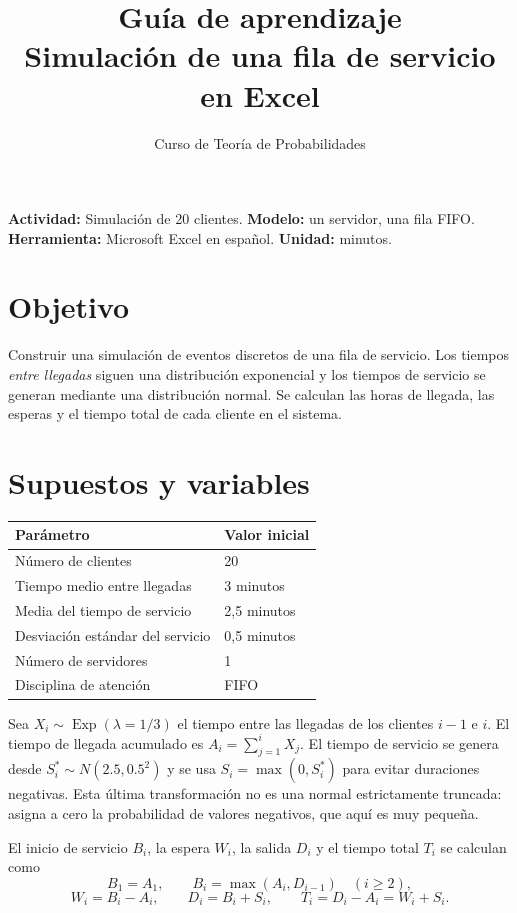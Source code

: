 \documentclass[11pt,a4paper]{article}
\title{\textcolor{azul}{Guía de aprendizaje}\\Simulación de una fila de servicio en Excel}
\author{Curso de Teoría de Probabilidades}
\date{}
\begin{document}
\maketitle
\noindent\textbf{Actividad:} Simulación de 20 clientes. \quad \textbf{Modelo:} un servidor, una fila FIFO.\\
\textbf{Herramienta:} Microsoft Excel en español. \quad \textbf{Unidad:} minutos.
\section{Objetivo}
Construir una simulación de eventos discretos de una fila de servicio. Los tiempos \emph{entre llegadas} siguen una distribución exponencial y los tiempos de servicio se generan mediante una distribución normal. Se calculan las horas de llegada, las esperas y el tiempo total de cada cliente en el sistema.
\section{Supuestos y variables}
\begin{center}\begin{tabular}{ll}\toprule Parámetro & Valor inicial\\\midrule Número de clientes & 20\\ Tiempo medio entre llegadas & 3 minutos\\ Media del tiempo de servicio & 2,5 minutos\\ Desviación estándar del servicio & 0,5 minutos\\ Número de servidores & 1\\ Disciplina de atención & FIFO\\\bottomrule\end{tabular}\end{center}
Sea $X_i\sim\operatorname{Exp}(\lambda=1/3)$ el tiempo entre las llegadas de los clientes $i-1$ e $i$. El tiempo de llegada acumulado es $A_i=\sum_{j=1}^{i}X_j$. El tiempo de servicio se genera desde $S_i^*\sim N(2.5,0.5^2)$ y se usa $S_i=\max(0,S_i^*)$ para evitar duraciones negativas. Esta última transformación no es una normal estrictamente truncada: asigna a cero la probabilidad de valores negativos, que aquí es muy pequeña.

El inicio de servicio $B_i$, la espera $W_i$, la salida $D_i$ y el tiempo total $T_i$ se calculan como
\[
B_1=A_1,\qquad B_i=\max(A_i,D_{i-1})\quad(i\ge2),
\]
\[
W_i=B_i-A_i,\qquad D_i=B_i+S_i,\qquad T_i=D_i-A_i=W_i+S_i.
\]
\end{document}
